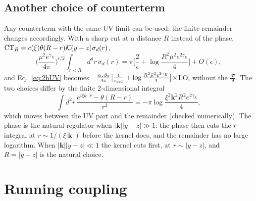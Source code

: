 \documentclass[10pt]{article}
\numberwithin{equation}{section}
\newcommand{\KK}{\mathcal K}
\newcommand{\mub}{\bar\mu}
\newcommand{\ve}{\epsilon}
\begin{document}
\subsection{Another choice of counterterm}
Any counterterm with the same UV limit can be used; the finite remainder changes accordingly. With a sharp cut at a distance $R$ instead of the phase, ${\rm CT}_R=c(\xi)\theta(R-r)\KK(y-z)\sigma_d(r)$,
\begin{equation}
\Big(\frac{\mu^2e^{\gamma_E}}{4\pi}\Big)^{\ve/2}\int_{r<R}d^dr\,\sigma_d(r)=\pi\Big[\frac2\ve+\log\frac{R^2\mub^2e^{2\gamma_E}}{4}\Big]+O(\ve),
\end{equation}
and Eq.~\eqref{eq:2bUV} becomes $-\frac{\alpha_s\beta_0}{4\pi}\big[\frac{1}{\ve_{\rm std}}+\log\frac{R^2\mub^2e^{2\gamma_E}}{4}\big]\times$LO, without the $\frac{67}{9}$. The two choices differ by the finite 2-dimensional integral
\begin{equation}
\int d^2r\,\frac{e^{i\xi k\cdot r}-\theta(R-r)}{r^2}=-\pi\log\frac{\xi^2\mathbf k^2R^2e^{2\gamma_E}}{4},
\end{equation}
which moves between the UV part and the remainder (checked numerically). The phase is the natural regulator when $|\mathbf k||y-z|\gg1$: the phase then cuts the $r$ integral at $r\sim1/(\xi|\mathbf k|)$ before the kernel does, and the remainder has no large logarithm. When $|\mathbf k||y-z|\ll1$ the kernel cuts first, at $r\sim|y-z|$, and $R=|y-z|$ is the natural choice.

\section{Running coupling}\label{sec:rc}
\end{document}
